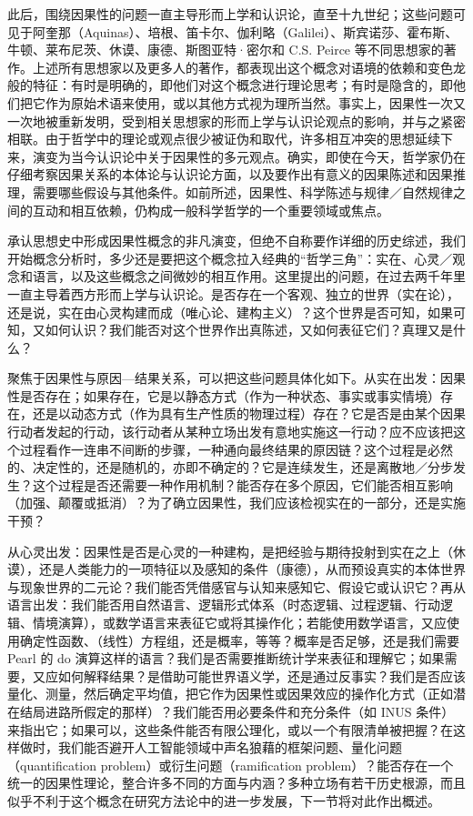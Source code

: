 此后，围绕因果性的问题一直主导形而上学和认识论，直至十九世纪；这些问题可见于阿奎那（Aquinas）、培根、笛卡尔、伽利略（Galilei）、斯宾诺莎、霍布斯、牛顿、莱布尼茨、休谟、康德、斯图亚特·密尔和 C.S. Peirce 等不同思想家的著作。上述所有思想家以及更多人的著作，都表现出这个概念对语境的依赖和变色龙般的特征：有时是明确的，即他们对这个概念进行理论思考；有时是隐含的，即他们把它作为原始术语来使用，或以其他方式视为理所当然。事实上，因果性一次又一次地被重新发明，受到相关思想家的形而上学与认识论观点的影响，并与之紧密相联。由于哲学中的理论或观点很少被证伪和取代，许多相互冲突的思想延续下来，演变为当今认识论中关于因果性的多元观点。确实，即使在今天，哲学家仍在仔细考察因果关系的本体论与认识论方面，以及要作出有意义的因果陈述和因果推理，需要哪些假设与其他条件。如前所述，因果性、科学陈述与规律／自然规律之间的互动和相互依赖，仍构成一般科学哲学的一个重要领域或焦点。

承认思想史中形成因果性概念的非凡演变，但绝不自称要作详细的历史综述，我们开始概念分析时，多少还是要把这个概念拉入经典的“哲学三角”：实在、心灵／观念和语言，以及这些概念之间微妙的相互作用。这里提出的问题，在过去两千年里一直主导着西方形而上学与认识论。是否存在一个客观、独立的世界（实在论），还是说，实在由心灵构建而成（唯心论、建构主义）？这个世界是否可知，如果可知，又如何认识？我们能否对这个世界作出真陈述，又如何表征它们？真理又是什么？

聚焦于因果性与原因—结果关系，可以把这些问题具体化如下。从实在出发：因果性是否存在；如果存在，它是以静态方式（作为一种状态、事实或事实情境）存在，还是以动态方式（作为具有生产性质的物理过程）存在？它是否是由某个因果行动者发起的行动，该行动者从某种立场出发有意地实施这一行动？应不应该把这个过程看作一连串不间断的步骤，一种通向最终结果的原因链？这个过程是必然的、决定性的，还是随机的，亦即不确定的？它是连续发生，还是离散地／分步发生？这个过程是否还需要一种作用机制？能否存在多个原因，它们能否相互影响（加强、颠覆或抵消）？为了确立因果性，我们应该检视实在的一部分，还是实施干预？

从心灵出发：因果性是否是心灵的一种建构，是把经验与期待投射到实在之上（休谟），还是人类能力的一项特征以及感知的条件（康德），从而预设真实的本体世界与现象世界的二元论？我们能否凭借感官与认知来感知它、假设它或认识它？再从语言出发：我们能否用自然语言、逻辑形式体系（时态逻辑、过程逻辑、行动逻辑、情境演算），或数学语言来表征它或将其操作化；若能使用数学语言，又应使用确定性函数、（线性）方程组，还是概率，等等？概率是否足够，还是我们需要 Pearl 的 do 演算这样的语言？我们是否需要推断统计学来表征和理解它；如果需要，又应如何解释结果？是借助可能世界语义学，还是通过反事实？我们是否应该量化、测量，然后确定平均值，把它作为因果性或因果效应的操作化方式（正如潜在结局进路所假定的那样）？我们能否用必要条件和充分条件（如 INUS 条件）来指出它；如果可以，这些条件能否有限公理化，或以一个有限清单被把握？在这样做时，我们能否避开人工智能领域中声名狼藉的框架问题、量化问题（quantification problem）或衍生问题（ramification problem）？能否存在一个统一的因果性理论，整合许多不同的方面与内涵？多种立场有若干历史根源，而且似乎不利于这个概念在研究方法论中的进一步发展，下一节将对此作出概述。
